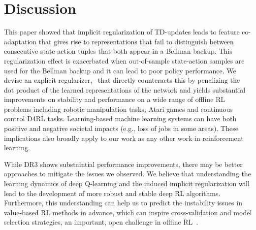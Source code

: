 \documentclass{article}
\begin{document}





\vspace{-10pt}
\section{Discussion}
\label{sec:discussion}
\vspace{-10pt}
This paper showed that implicit regularization of TD-updates leads to feature co-adaptation that gives rise to representations that fail to distinguish between consecutive state-action tuples that both appear in a Bellman backup. This regularization effect is exacerbated when out-of-sample %
state-action samples are used for the Bellman backup and it can lead to poor policy performance. We devise an explicit regularizer, \methodname\ that directly counteracts this by penalizing the dot product of the learned representations of the network and yields substantial improvements on stability and performance on a wide range of offline RL problems including robotic manipulation tasks, Atari games and continuous control D4RL tasks. Learning-based machine learning systems can have both positive and negative societal impacts  (e.g., loss of jobs in some areas). These implications also broadly apply to our work as any other work in reinforcement learning.  

While DR3 shows substaintial performance improvements, there may be better approaches to mitigate the issues we observed. We believe that understanding the learning dynamics of deep Q-learning and the induced implicit regularization will lead to the development of more robust and stable deep RL algorithms. Furthermore, this understanding can help us to predict the instability issues in value-based RL methods in advance, which can inspire cross-validation and model selection strategies, an important, open challenge in offline RL~\citep{fu2021benchmarks}. 
\end{document}
